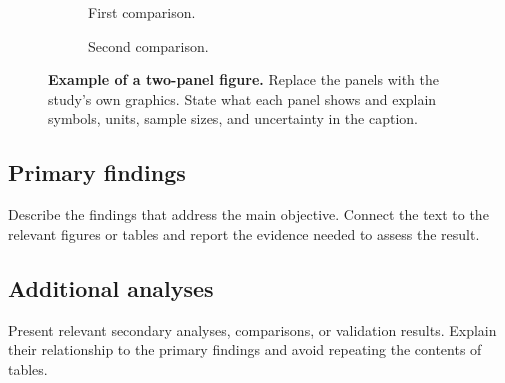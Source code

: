 \begin{figure}[htbp]
\centering
\begin{subfigure}[t]{0.48\linewidth}
  \centering
  \caption{First comparison.}
  \label{fig:example-a}
\end{subfigure}\hfill
\begin{subfigure}[t]{0.48\linewidth}
  \centering
  \caption{Second comparison.}
  \label{fig:example-b}
\end{subfigure}
\caption{\textbf{Example of a two-panel figure.} Replace the panels with the study's own graphics. State what each panel shows and explain symbols, units, sample sizes, and uncertainty in the caption.}
\label{fig:example-panels}
\end{figure}

\subsection{Primary findings}
Describe the findings that address the main objective. Connect the text to the relevant figures or tables and report the evidence needed to assess the result.

\subsection{Additional analyses}
Present relevant secondary analyses, comparisons, or validation results. Explain their relationship to the primary findings and avoid repeating the contents of tables.
